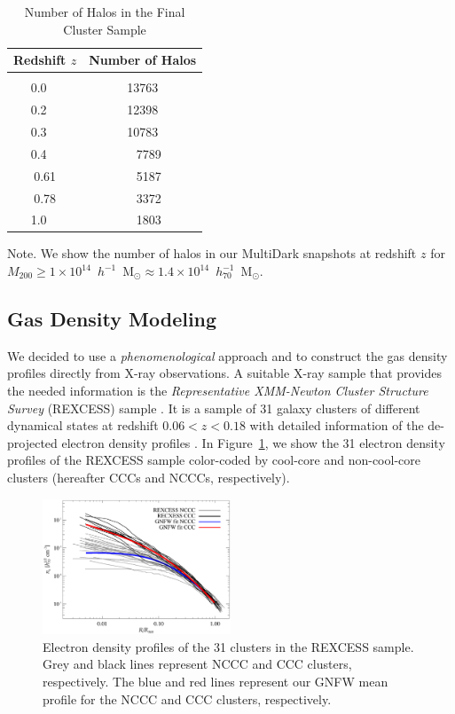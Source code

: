\documentclass[traditabstract]{aa}
\begin{document}
\begin{table}[t]
\begin{center}
\caption{Number of Halos in the Final Cluster Sample}
\medskip
\begin{tabular}{cc}
\hline
\phantom{\Big|}
Redshift $z$ & Number of Halos \\
\hline\\[-0.5em]
 0.0~~ &  13763\\
 0.2~~ &  12398\\
 0.3~~ &  10783\\ 
 0.4~~ &   ~~7789\\ 
 0.61  &  ~~5187\\ 
 0.78  &  ~~3372\\ 
 1.0~~ &  ~~1803\\[0.5em]
\hline
\end{tabular}
\label{tab:z}
\end{center}
\footnotesize{Note. We show the number of halos in our MultiDark snapshots at redshift $z$ for $M_{200}\geq1\times10^{14}$~$h^{-1}$~M$_{\odot}\approx1.4\times10^{14}$~$h_{70}^{-1}$~M$_{\odot}$. }
\end{table}


\subsection{Gas Density Modeling}
\label{sec:2.2}

We decided to use a \emph{phenomenological} approach and to construct the gas
density profiles directly from X-ray observations. A suitable X-ray sample that
provides the needed information is the \emph{Representative XMM-Newton Cluster
  Structure Survey} (REXCESS) sample \citep{2008A&A...487..431C,
  2009A&A...498..361P}. It is a sample of 31 galaxy clusters of different
dynamical states at redshift $0.06<z<0.18$ with detailed information of the
de-projected electron density profiles \citep{2008A&A...487..431C}. In
Figure~\ref{fig:gas_profiles}, we show the 31 electron density profiles of the
REXCESS sample color-coded by cool-core and non-cool-core clusters (hereafter
CCCs and NCCCs, respectively).

\begin{figure}[t]
\centering
\includegraphics[width=0.5\textwidth]{figures/gas_profiles.eps}
\caption{Electron density profiles of the 31 clusters in the REXCESS sample. Grey and black lines represent NCCC and CCC clusters, respectively. The blue and red lines represent our GNFW mean profile for the NCCC and CCC clusters, respectively.}
\label{fig:gas_profiles}
\end{figure}
\end{document}
